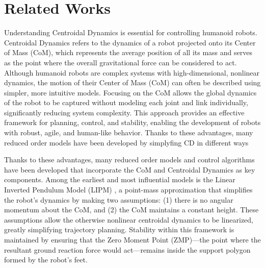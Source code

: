 \documentclass[main.tex]{subfiles}
\begin{document}
\section{Related Works}\label{sec:relatedworks}
Understanding Centroidal Dynamics \cite{orin2013centroidal} is essential for controlling humanoid robots. Centroidal Dynamics \cite{orin2013centroidal} refers to the dynamics of a robot projected onto its Center of Mass (CoM),  which represents the average position of all its mass and serves as the point where the overall gravitational force can be considered to act. Although humanoid robots are complex systems with high-dimensional, nonlinear dynamics, the motion of their Center of Mass (CoM) can often be described using simpler, more intuitive models. Focusing on the CoM allows the global dynamics of the robot to be captured without modeling each joint and link individually, significantly reducing system complexity. This approach provides an effective framework for planning, control, and stability, enabling the development of robots with robust, agile, and human-like behavior.
Thanks to these advantages, many reduced order models have been developed by simplyfing CD in different ways 



Thanks to these advantages, many reduced order models and control algorithms have been developed that incorporate the CoM and Centroidal Dynamics as key components. Among the earliest and most influential models is the Linear Inverted Pendulum Model (LIPM) \cite{LIPM}, a point-mass approximation that simplifies the robot’s dynamics by making two assumptions: (1) there is no angular momentum about the CoM, and (2) the CoM maintains a constant height. These assumptions allow the otherwise nonlinear centroidal dynamics to be linearized, greatly simplifying trajectory planning. Stability within this framework is maintained by ensuring that the Zero Moment Point (ZMP)—the point where the resultant ground reaction force would act—remains inside the support polygon formed by the robot’s feet.
\end{document}
